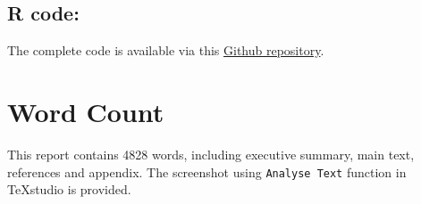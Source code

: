 \documentclass[11pt,twoside]{article}
\numberwithin{Theorem}{section}
\numberwithin{Definition}{section}
\numberwithin{Lemma}{section}
\numberwithin{Algorithm}{section}
\numberwithin{equation}{section}
\begin{document}
\subsection*{R code: }
The complete code is available via this \href{https://github.com/Shi-Yile/Project-1-Dementia-Risk-Factors.git}{Github repository}.

\clearpage

\section*{Word Count}

This report contains 4828 words, including executive summary, main text, references and appendix. The screenshot using  \texttt{Analyse Text} function in TeXstudio is provided.
\end{document}
